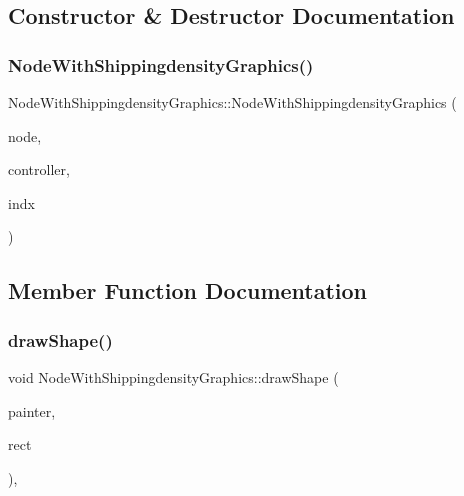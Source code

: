 \subsection{Constructor \& Destructor Documentation}
\mbox{\label{class_node_with_shippingdensity_graphics_a4d7c6832d200e767036f8f99c667c0b9}} 
\subsubsection{\texorpdfstring{NodeWithShippingdensityGraphics()}{NodeWithShippingdensityGraphics()}}
{\footnotesize\ttfamily Node\+With\+Shippingdensity\+Graphics\+::\+Node\+With\+Shippingdensity\+Graphics (\begin{DoxyParamCaption}\item[{\mbox{\hyperlink{class_node_data}{Node\+Data}} $\ast$}]{node,  }\item[{\mbox{\hyperlink{class_map_objects_controller}{Map\+Objects\+Controller}} $\ast$}]{controller,  }\item[{int}]{indx }\end{DoxyParamCaption})\hspace{0.3cm}{\ttfamily [inline]}}



\subsection{Member Function Documentation}
\mbox{\label{class_node_with_shippingdensity_graphics_abf3585be954f535699f24e22df8e1236}} 
\subsubsection{\texorpdfstring{drawShape()}{drawShape()}}
{\footnotesize\ttfamily void Node\+With\+Shippingdensity\+Graphics\+::draw\+Shape (\begin{DoxyParamCaption}\item[{Q\+Painter \&}]{painter,  }\item[{const qmapcontrol\+::\+Rect\+World\+Px \&}]{rect }\end{DoxyParamCaption})\hspace{0.3cm}{\ttfamily [protected]}, {\ttfamily [virtual]}}



